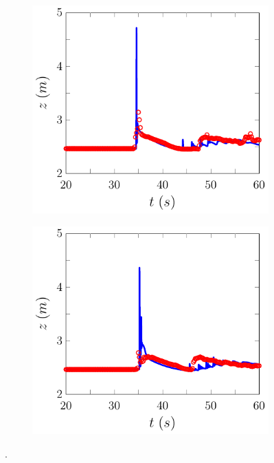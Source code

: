\begin{figure}
\begin{subfigure}{0.5\textwidth}
		\vspace{0.5cm}
	\end{subfigure}
	\begin{subfigure}{0.5\textwidth}
		\includegraphics[width=\textwidth]{./chp6/figures/Experiment/Roeber/Trial8/FEVM/WG11-figure0.pdf}
		\vspace{0.5cm}
	\end{subfigure}%
	\begin{subfigure}{0.5\textwidth}
		\includegraphics[width=\textwidth]{./chp6/figures/Experiment/Roeber/Trial8/FEVM/WG12-figure0.pdf}
		\vspace{0.5cm}
	\end{subfigure}
	\caption{.}
	\label{fig:Roeber8WG7to12FEVM}
\end{figure}



